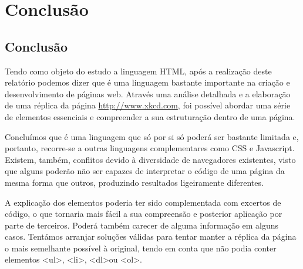 \documentclass[11pt,openright,twoside]{report}
\begin{document}
\part{Conclusão}

\chapter{Conclusão}
Tendo como objeto do estudo a linguagem HTML, após a realização deste relatório podemos dizer que é uma linguagem bastante importante na criação e desenvolvimento de páginas web. Através uma análise detalhada e a elaboração de uma réplica da página \url{http://www.xkcd.com}, foi possível abordar uma série de elementos essenciais e compreender a sua estruturação dentro de uma página.
\smallskip

Concluímos que é uma linguagem que só por si só poderá ser bastante limitada e, portanto, recorre-se a outras linguagens complementares como CSS e Javascript. Existem, também, conflitos devido à diversidade de navegadores existentes, visto que alguns poderão não ser capazes de interpretar o código de uma página da mesma forma que outros, produzindo resultados ligeiramente diferentes.
\smallskip

A explicação dos elementos poderia ter sido complementada com excertos de código, o que tornaria mais fácil a sua compreensão e posterior aplicação por parte de terceiros. Poderá também carecer de alguma informação em alguns casos. Tentámos arranjar soluções válidas para tentar manter a réplica da página o mais semelhante possível à original, tendo em conta que não podia conter elementos \textless ul\textgreater, \textless li\textgreater, \textless dl\textgreater ou \textless ol\textgreater.



\end{document}
